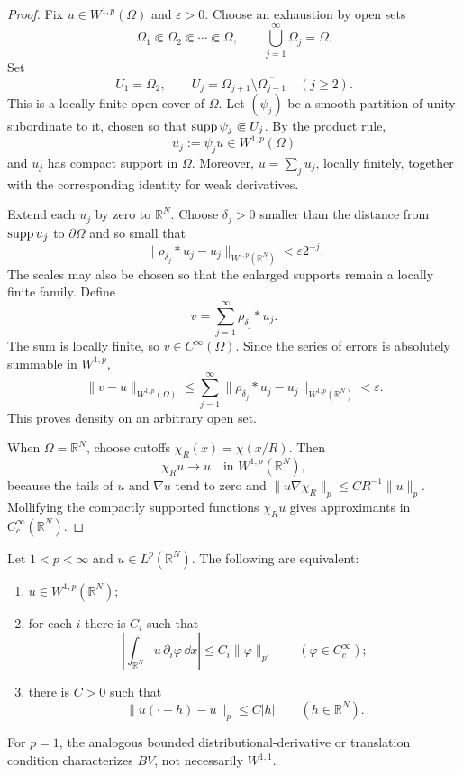 \begin{proof}
Fix $u\in W^{1,p}(\Omega)$ and $\varepsilon>0$.  Choose an exhaustion by open
sets
\[
  \Omega_1\Subset\Omega_2\Subset\cdots\Subset\Omega,
  \qquad
  \bigcup_{j=1}^\infty\Omega_j=\Omega.
\]
Set
\[
  U_1=\Omega_2,
  \qquad
  U_j=\Omega_{j+1}\setminus\overline{\Omega_{j-1}}
  \quad(j\ge2).
\]
This is a locally finite open cover of $\Omega$.  Let $(\psi_j)$ be a smooth
partition of unity subordinate to it, chosen so that
$\operatorname{supp}\psi_j\Subset U_j$.  By the product rule,
\[
  u_j:=\psi_j u\in W^{1,p}(\Omega)
\]
and $u_j$ has compact support in $\Omega$.  Moreover,
$u=\sum_j u_j$, locally finitely, together with the corresponding identity for
weak derivatives.

Extend each $u_j$ by zero to $\mathbb R^N$.  Choose
$\delta_j>0$ smaller than the distance from $\operatorname{supp} u_j$ to
$\partial\Omega$ and so small that
\[
  \|\rho_{\delta_j}*u_j-u_j\|_{W^{1,p}(\mathbb R^N)}
  <\varepsilon 2^{-j}.
\]
The scales may also be chosen so that the enlarged supports remain a locally
finite family.  Define
\[
  v=\sum_{j=1}^\infty\rho_{\delta_j}*u_j.
\]
The sum is locally finite, so $v\in C^\infty(\Omega)$.  Since the series of
errors is absolutely summable in $W^{1,p}$,
\[
  \|v-u\|_{W^{1,p}(\Omega)}
  \le\sum_{j=1}^\infty
      \|\rho_{\delta_j}*u_j-u_j\|_{W^{1,p}(\mathbb R^N)}
  <\varepsilon.
\]
This proves density on an arbitrary open set.

When $\Omega=\mathbb R^N$, choose cutoffs
$\chi_R(x)=\chi(x/R)$.  Then
\[
  \chi_Ru\to u\quad\text{in }W^{1,p}(\mathbb R^N),
\]
because the tails of $u$ and $\nabla u$ tend to zero and
$\|u\nabla\chi_R\|_p\le C R^{-1}\|u\|_p$.  Mollifying the compactly supported
functions $\chi_Ru$ gives approximants in $C_c^\infty(\mathbb R^N)$.
\end{proof}

\begin{notetheorem}
Let $1<p<\infty$ and $u\in L^p(\mathbb R^N)$.  The following are equivalent:
\begin{enumerate}
  \item $u\in W^{1,p}(\mathbb R^N)$;
  \item for each $i$ there is $C_i$ such that
        \[
          \left|\int_{\mathbb R^N}u\,\partial_i\varphi\,\dd x\right|
          \le C_i\|\varphi\|_{p'}
          \qquad(\varphi\in C_c^\infty);
        \]
  \item there is $C>0$ such that
        \[
          \|u(\cdot+h)-u\|_p\le C|h|
          \qquad(h\in\mathbb R^N).
        \]
\end{enumerate}
For $p=1$, the analogous bounded distributional-derivative or translation
condition characterizes $BV$, not necessarily $W^{1,1}$.
\end{notetheorem}

